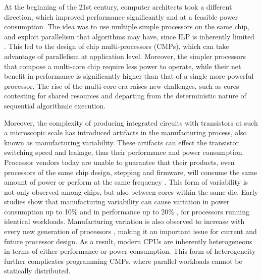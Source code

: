 At the beginning of the 21st century, computer architects took a different direction,
which improved performance significantly and at a feasible power consumption.  The idea
was to use multiple simple processors on the same chip, and exploit parallelism that
algorithms may have, since ILP is inherently limited \cite{Wall:1991:LIP:106972.106991}.
This led to the design of chip multi-processors (CMPs), which can take advantage of
parallelism at application level.  Moreover, the simpler processors that compose a
multi-core chip require less power to operate, while their net benefit in performance is
significantly higher than that of a single more powerful processor.  The rise of the
multi-core era raises new challenges, such as cores contesting for shared resources and
departing from the deterministic nature of sequential algorithmic execution.  

Moreover, the complexity of producing integrated circuits with transistors at such a
microscopic scale has introduced artifacts in the manufacturing process, also known as
manufacturing variability.  These artifacts can effect the transistor switching speed and
leakage, thus their performance and power consumption.   Processor vendors today are
unable to guarantee that their products, even processors of the same chip design, stepping
and firmware, will consume the same amount of power or perform at the same frequency
\cite{Rountree:2012:BDF:2357488.2357648}.  This form of variability is not only observed
among chips, but also between cores within the same die.  Early studies show that
manufacturing variability can cause variation in power consumption up to 10\%
\cite{Rountree:2012:BDF:2357488.2357648} and in performance up to 20\%
\cite{Marathe:2017:ESP:3149412.3149421}, for processors running identical workloads.
Manufacturing variation is also observed to increase with every new generation of
processors \cite{Marathe:2017:ESP:3149412.3149421}, making it an important issue for
current and future processor design.  As a result, modern CPUs are inherently
heterogeneous in terms of either performance or power consumption.  This form of
heterogeneity further complicates programming CMPs, where parallel workloads cannot be
statically distributed.

